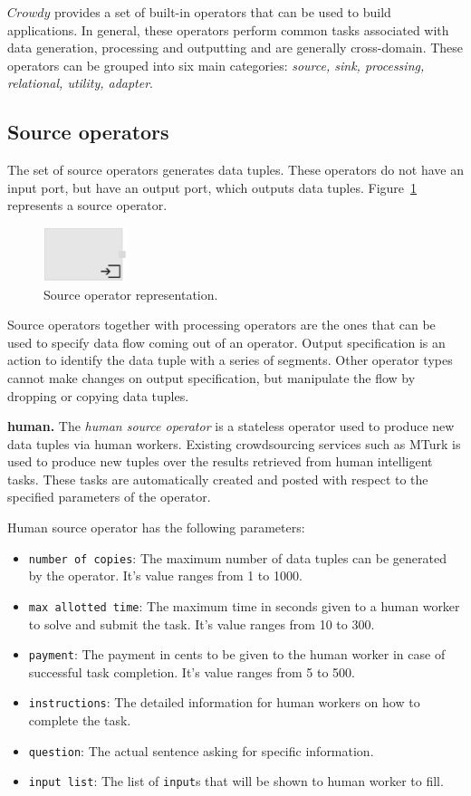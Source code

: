 $Crowdy$ provides a set of built-in operators that can be used to build applications. 
In general, these operators perform common tasks associated with data generation, 
processing and outputting and are generally cross-domain. These operators can be 
grouped into six main categories: \textit{source, sink, processing, relational, utility, adapter}.

\subsection{Source operators}
The set of source operators generates data tuples. These operators do not have 
an input port, but have an output port, which outputs data tuples. Figure~\ref{fig:source operator} 
represents a source operator.

\begin{figure}[ht]
	\centering
	\includegraphics[height=60px]{figures/SourceOperator.pdf}
	\caption{Source operator representation.}
	\label{fig:source operator}
\end{figure}

Source operators together with processing operators are the ones that can be 
used to specify data flow coming out of an operator. Output specification is an 
action to identify the data tuple with a series of segments. Other operator types 
cannot make changes on output specification, but manipulate the flow by dropping 
or copying data tuples.

\textbf{human.} 
The \textit{human source operator} is a stateless operator used to produce new data tuples 
via human workers. Existing crowdsourcing services such as MTurk is used 
to produce new tuples over the results retrieved from human intelligent tasks. These 
tasks are automatically created and posted with respect to the specified parameters 
of the operator.

Human source operator has the following parameters:
\begin{itemize}
	\item \texttt{number of copies}: The maximum number of data tuples can be 
	generated by the operator. It's value ranges from 1 to 1000.
	\item \texttt{max allotted time}: The maximum time in seconds given to a human 
	worker to solve and submit the task. It's value ranges from 10 to 300.
	\item \texttt{payment}: The payment in cents to be given to the human worker in 
	case of successful task completion. It's value ranges from 5 to 500.
	\item \texttt{instructions}: The detailed information for human workers on how to 
	complete the task.
	\item \texttt{question}: The actual sentence asking for specific information.
	\item \texttt{input list}: The list of \texttt{input}s that will be shown to human worker to fill.
\end{itemize}

